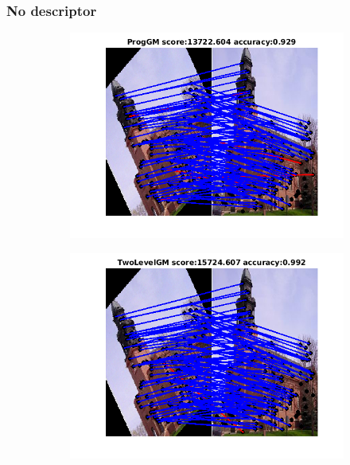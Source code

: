 \documentclass[
	fontsize=12pt,
	paper=a4,
	twoside=false,
	numbers=noenddot,
	plainheadsepline,
	toc=listof,
	toc=bibliography
]{scrartcl}
\begin{document}
\subsubsection{No descriptor}
\begin{figure}[h] 
	
	\begin{subfigure}[b]{0.3\textwidth}
		\centering
		\includegraphics[scale=0.4]{"fig_ver2608/RealImages/Img_trafo/no_descr/using_cdf_afftrafo/fi_1_ProgGM"} 
	\end{subfigure}%
	\begin{subfigure}[b]{0.3\textwidth}
		\centering
		\includegraphics[scale=0.4]{"fig_ver2608/RealImages/Img_trafo/no_descr/using_cdf_afftrafo/fi_1_2lGM"} 

\end{subfigure}
\end{figure}
\end{document}

